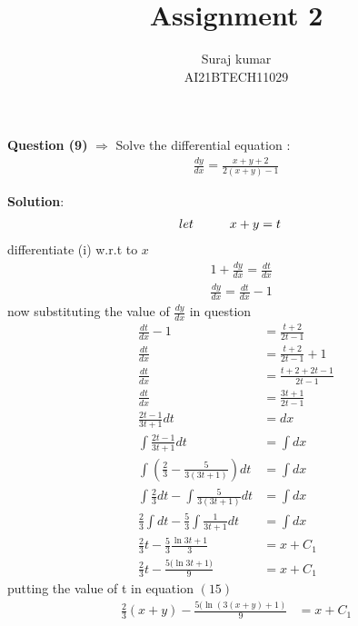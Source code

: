 \documentclass[journal,12pt,twocolumn]{IEEEtran}
\title{Assignment 2}
\author{Suraj kumar \\ \normalsize AI21BTECH11029 \\}
\begin{document}
\maketitle
\textbf{Question (9)} $\Rightarrow$ Solve the differential equation :
  \begin{align*}
  \frac{dy}{dx}=\frac{x+y+2}{2(x+y)-1}
  \end{align*}
  
\textbf{Solution}:
\begin{align}
let \hspace{10mm} &x+y=t
\end{align}
 differentiate (i) w.r.t to $x$
 \begin{align}
 	& 1+\frac{dy}{dx}=\frac{dt}{dx}\\
  	& \frac{dy}{dx}=\frac{dt}{dx}-1
 \end{align}
now substituting the value of $\frac{dy}{dx}$ in question
\begin{align}
	\frac{dt}{dx}-1&=\frac{t+2}{2t-1}\\
	\frac{dt}{dx}&=\frac{t+2}{2t-1}+1\\
	\frac{dt}{dx}&=\frac{t+2+2t-1}{2t-1}\\
	\frac{dt}{dx}&=\frac{3t+1}{2t-1}\\	
	\frac{2t-1}{3t+1}dt&=dx\\	
	\int \frac{2t-1}{3t+1}dt&=\int dx\\
	\int \left( \frac{2}{3}-\frac{5}{3(3t+1)} \right)dt&=\int dx\\
	\int \frac{2}{3}dt- \int \frac{5}{3(3t+1)}dt&=\int dx\\
	\frac{2}{3}\int dt-\frac{5}{3} \int \frac{1}{3t+1}dt&=\int dx\\
	\frac{2}{3} t-\frac{5}{3}\frac{\ln{3t+1}}{3}&=x+C_1\\
	\frac{2}{3} t-\frac{5(\ln{3t+1)}}{9}&=x+C_1
\end{align}
putting the value of t in equation $(15)$
\begin{align}
\frac{2}{3}(x+y)-\frac{5(\ln(3(x+y)+1)}{9}&=x+C_1
\end{align}
\end{document}
